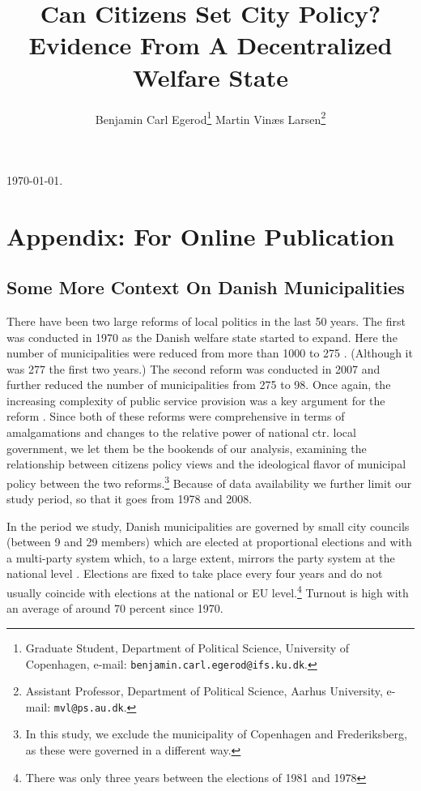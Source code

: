 \documentclass[a4paper,12pt]{article}
\title{\bigskip \bigskip \sffamily \LARGE{Can Citizens Set City Policy?} \\ \Large{ Evidence From A Decentralized Welfare State}}
\author{\bigskip Benjamin Carl Egerod\footnote[2]{Graduate Student, Department of Political Science, University of Copenhagen, e-mail: \texttt{benjamin.carl.egerod@ifs.ku.dk}.} \qquad Martin Vinæs Larsen\footnote[3]{Assistant Professor, Department of Political Science, Aarhus University, e-mail: \texttt{mvl@ps.au.dk}.}}
\begin{document}
	
	\begin{footnotesize} \noindent \today. \end{footnotesize} %
	
\onehalfspacing


\renewcommand{\thesubsection}{\Alph{subsection}}
\renewcommand{\thetable}{\Alph{subsection}\arabic{table}}
\renewcommand{\thefigure}{\Alph{subsection}\arabic{figure}}

\section*{Appendix: For Online Publication}


\clearpage


\subsection{Some More Context On Danish Municipalities} \label{context}
There have been two large reforms of local politics in the last 50 years. The first was conducted in 1970 as the Danish welfare state started to expand. Here the number of municipalities were reduced from more than 1000 to 275 \citep{ingvartsen1991kommunalreformen}. (Although it was 277 the first two years.)  The second reform was conducted in 2007 and further reduced the number of municipalities from 275 to 98. Once again, the increasing complexity of public service provision was a key argument for the reform \citep{christiansen2008utaenkelige}. Since both of these reforms were comprehensive in terms of amalgamations and changes to the relative power of national ctr. local government, we let them be the bookends of our analysis, examining the relationship between citizens policy views and the ideological flavor of municipal policy between the two reforms.\footnote{In this study, we exclude the municipality of Copenhagen and Frederiksberg, as these were governed in a different way.} Because of data availability we further limit our study period, so that it goes from 1978 and 2008.

In the period we study, Danish municipalities are governed by small city councils (between 9 and 29 members) which are elected at proportional elections and with a multi-party system which, to a large extent, mirrors the party system at the national level \citep{blom2013et}. Elections are fixed to take place every four years and do not usually coincide with elections at the national or EU level.\footnote{There was only three years between the elections of 1981 and 1978} Turnout is high with an average of around 70 percent since 1970.  
\end{document}
